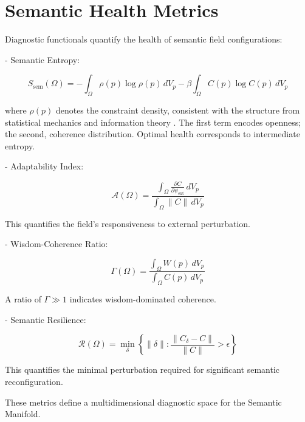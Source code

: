 
\section{Semantic Health Metrics}
\label{sec:semantic_health_metrics}

Diagnostic functionals quantify the health of semantic field configurations:

- Semantic Entropy:

\begin{equation}
S_{\text{sem}}(\Omega) = -\int_{\Omega} \rho(p) \log\rho(p) \, dV_p - \beta \int_{\Omega} C(p) \log C(p) \, dV_p
\end{equation}

where $\rho(p)$ denotes the constraint density, consistent with the structure from statistical mechanics and information theory \autocite{Shannon1948, CoverThomas2006, Reif1965, PathriaBeale2011}. The first term encodes openness; the second, coherence distribution. Optimal health corresponds to intermediate entropy.

- Adaptability Index:

\begin{equation}
\mathcal{A}(\Omega) = \frac{\int_{\Omega} \frac{\partial C}{\partial \psi_{\text{ext}}} \, dV_p}{\int_{\Omega} \|C\| \, dV_p}
\end{equation}

This quantifies the field's responsiveness to external perturbation.

- Wisdom-Coherence Ratio:

\begin{equation}
\Gamma(\Omega) = \frac{\int_{\Omega} W(p) \, dV_p}{\int_{\Omega} C(p) \, dV_p}
\end{equation}

A ratio of $\Gamma \gg 1$ indicates wisdom-dominated coherence.

- Semantic Resilience:

\begin{equation}
\mathcal{R}(\Omega) = \min_{\delta} \left\{\|\delta\| : \frac{\|C_{\delta} - C\|}{\|C\|} > \epsilon\right\}
\end{equation}

This quantifies the minimal perturbation required for significant semantic reconfiguration.

These metrics define a multidimensional diagnostic space for the Semantic Manifold.


